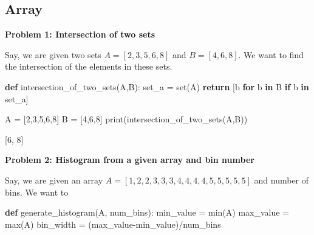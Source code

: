 \documentclass[
  letterpaper,
  DIV=11,
  numbers=noendperiod]{scrartcl}
\newenvironment{Shaded}{\begin{snugshade}}{\end{snugshade}}
\newcommand{\BuiltInTok}[1]{\textcolor[rgb]{0.00,0.23,0.31}{#1}}
\newcommand{\ControlFlowTok}[1]{\textcolor[rgb]{0.00,0.23,0.31}{\textbf{#1}}}
\newcommand{\DecValTok}[1]{\textcolor[rgb]{0.68,0.00,0.00}{#1}}
\newcommand{\KeywordTok}[1]{\textcolor[rgb]{0.00,0.23,0.31}{\textbf{#1}}}
\newcommand{\NormalTok}[1]{\textcolor[rgb]{0.00,0.23,0.31}{#1}}
\newcommand{\OperatorTok}[1]{\textcolor[rgb]{0.37,0.37,0.37}{#1}}
\begin{document}
\subsection{Array}\label{array}

\begin{tcolorbox}[enhanced jigsaw, arc=.35mm, bottomrule=.15mm, breakable, colback=white, colframe=quarto-callout-note-color-frame, left=2mm, leftrule=.75mm, opacityback=0, rightrule=.15mm, toprule=.15mm]

\vspace{-3mm}\textbf{Problem 1: Intersection of two sets}\vspace{3mm}

Say, we are given two sets \(A=[2,3,5,6,8]\) and \(B=[4,6,8]\). We want
to find the intersection of the elements in these sets.

\begin{Shaded}
\begin{Highlighting}[]
\KeywordTok{def}\NormalTok{ intersection\_of\_two\_sets(A,B):}
\NormalTok{  set\_a }\OperatorTok{=} \BuiltInTok{set}\NormalTok{(A)}
  \ControlFlowTok{return}\NormalTok{ [b }\ControlFlowTok{for}\NormalTok{ b }\KeywordTok{in}\NormalTok{ B }\ControlFlowTok{if}\NormalTok{ b }\KeywordTok{in}\NormalTok{ set\_a]}

\NormalTok{A }\OperatorTok{=}\NormalTok{ [}\DecValTok{2}\NormalTok{,}\DecValTok{3}\NormalTok{,}\DecValTok{5}\NormalTok{,}\DecValTok{6}\NormalTok{,}\DecValTok{8}\NormalTok{]}
\NormalTok{B }\OperatorTok{=}\NormalTok{ [}\DecValTok{4}\NormalTok{,}\DecValTok{6}\NormalTok{,}\DecValTok{8}\NormalTok{]}
\BuiltInTok{print}\NormalTok{(intersection\_of\_two\_sets(A,B))}
\end{Highlighting}
\end{Shaded}

{[}6, 8{]}

\end{tcolorbox}

\begin{tcolorbox}[enhanced jigsaw, arc=.35mm, bottomrule=.15mm, breakable, colback=white, colframe=quarto-callout-note-color-frame, left=2mm, leftrule=.75mm, opacityback=0, rightrule=.15mm, toprule=.15mm]

\vspace{-3mm}\textbf{Problem 2: Histogram from a given array and bin number}\vspace{3mm}

Say, we are given an array \(A=[1,2,2,3,3,3,4,4,4,4,5,5,5,5,5]\) and
number of bins. We want to

\begin{Shaded}
\begin{Highlighting}[]
\KeywordTok{def}\NormalTok{ generate\_histogram(A, num\_bins):}
\NormalTok{  min\_value }\OperatorTok{=} \BuiltInTok{min}\NormalTok{(A)}
\NormalTok{  max\_value }\OperatorTok{=} \BuiltInTok{max}\NormalTok{(A)}
\NormalTok{  bin\_width }\OperatorTok{=}\NormalTok{ (max\_value}\OperatorTok{{-}}\NormalTok{min\_value)}\OperatorTok{/}\NormalTok{num\_bins}
\end{Highlighting}
\end{Shaded}

\end{tcolorbox}
\end{document}

